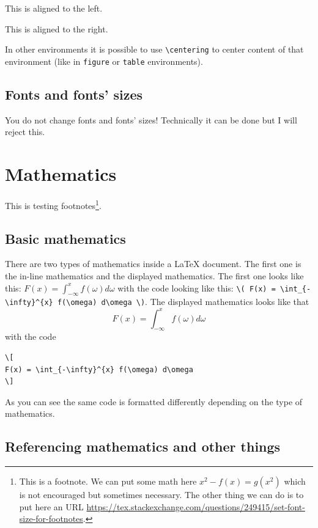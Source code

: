 \documentclass[english, twoside, 12pt, a4paper]{article}
\theoremstyle{definition}
\theoremstyle{plain}
\theoremstyle{remark}
\begin{document}
\begin{flushleft}
  This is aligned to the left.
\end{flushleft}

\begin{flushright}
  This is aligned to the right. 
\end{flushright}

In other environments it is possible to use \verb+\centering+ to center content of that environment (like in \verb+figure+ or \verb+table+ environments).

\subsection{Fonts and fonts' sizes}

You do not change fonts and fonts' sizes! Technically it can be done but I will reject this.

\clearpage
\section{Mathematics}

This is testing footnotes\footnote{This is a footnote. We can put some math here \( x^2 - f(x) = g(x^2) \) which is not encouraged but sometimes necessary. The other thing we can do is to put here an URL \url{https://tex.stackexchange.com/questions/249415/set-font-size-for-footnotes}. }.

\subsection{Basic mathematics}

There are two types of mathematics inside a \LaTeX{} document. The first one is the in-line mathematics and the displayed mathematics. The first one looks like this: \( F(x) = \int_{-\infty}^{x} f(\omega) d\omega \) with the code looking like this: \verb!\( F(x) = \int_{-\infty}^{x} f(\omega) d\omega \)!. The displayed mathematics looks like that
\[
F(x) = \int_{-\infty}^{x} f(\omega) d\omega
\]
with the code
\begin{verbatim}
\[
F(x) = \int_{-\infty}^{x} f(\omega) d\omega
\]
\end{verbatim}
As you can see the same code is formatted differently depending on the type of mathematics.

\subsection{Referencing mathematics and other things}
\end{document}

